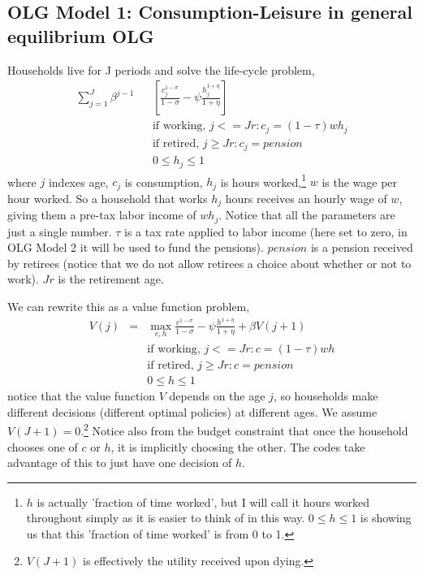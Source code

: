 
\subsection{OLG Model 1: Consumption-Leisure in general equilibrium OLG}
Households live for J periods and solve the life-cycle problem,
\begin{eqnarray*}
 \sum_{j=1}^J \beta^{j-1} && \left[ \frac{c_j^{1-\sigma}}{1-\sigma} - \psi \frac{h_j^{1+\eta}}{1+\eta} \right] \\
&&\text{if working, }j<=Jr: c_j=(1-\tau) w h_j \\
&&\text{if retired, }j\geq Jr: c_j=pension \\
&& 0\leq h_j \leq 1
\end{eqnarray*}
where $j$ indexes age, $c_j$ is consumption, $h_j$ is hours worked,\footnote{$h$ is actually 'fraction of time worked', but I will call it hours worked throughout simply as it is easier to think of in this way. $0\leq h \leq 1$ is showing us that this 'fraction of time worked' is from 0 to 1.} $w$ is the wage per hour worked. So a household that works $h_j$ hours receives an hourly wage of $w$, giving them a pre-tax labor income of $w h_j$. Notice that all the parameters are just a single number. $\tau$ is a tax rate applied to labor income (here set to zero, in OLG Model 2 it will be used to fund the pensions). $pension$ is a pension received by retirees (notice that we do not allow retirees a choice about whether or not to work). $Jr$ is the retirement age.

We can rewrite this as a value function problem,
\begin{eqnarray*}
 V(j)&=& \max_{c,h} \frac{c^{1-\sigma}}{1-\sigma} - \psi \frac{h^{1+\eta}}{1+\eta}  + \beta V(j+1) \\
&&\text{if working, }j<=Jr: c=(1-\tau) w h \\
&&\text{if retired, }j\geq Jr: c=pension \\
&& 0\leq h \leq 1
\end{eqnarray*}
notice that the value function $V$ depends on the age $j$, so households make different decisions (different optimal policies) at different ages. We assume $V(J+1)=0$.\footnote{$V(J+1)$ is effectively the utility received upon dying.} Notice also from the budget constraint that once the household chooses one of $c$ or $h$, it is implicitly choosing the other. The codes take advantage of this to just have one decision of $h$.

